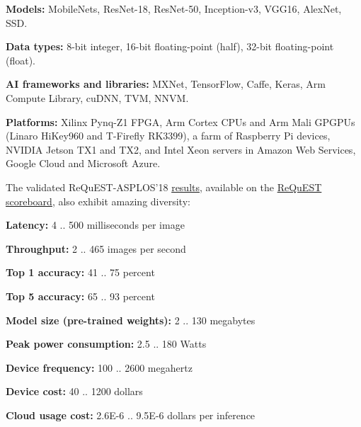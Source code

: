 \documentclass[10pt,onecolumn]{article}
\newenvironment{packed_itemize}{
\begin{itemize}
  \setlength{\itemsep}{1pt}
  \setlength{\parskip}{0pt}
  \setlength{\parsep}{0pt}
}{\end{itemize}}
\begin{document}
\begin{packed_itemize}

 \item \textbf{Models:} MobileNets, ResNet-18, ResNet-50, Inception-v3, VGG16, AlexNet, SSD.
 \item \textbf{Data types:} 8-bit integer, 16-bit floating-point (half), 32-bit floating-point (float).
 \item \textbf{AI frameworks and libraries:} MXNet, TensorFlow, Caffe, Keras, Arm Compute Library, cuDNN, TVM, NNVM.
 \item \textbf{Platforms:} Xilinx Pynq-Z1 FPGA, Arm Cortex CPUs and Arm Mali GPGPUs (Linaro HiKey960 and T-Firefly RK3399), a farm of Raspberry Pi devices, NVIDIA Jetson TX1 and TX2, and Intel Xeon servers in Amazon Web Services, Google Cloud and Microsoft Azure.

\end{packed_itemize}

The validated ReQuEST-ASPLOS'18 \href{http://github.com/ctuning/ck-request-asplos18-results}{results}, 
available on the \href{http://cKnowledge.org/request-results}{ReQuEST scoreboard}, also exhibit amazing diversity:

\begin{packed_itemize}

 \item \textbf{Latency:} 4 .. 500 milliseconds per image
 \item \textbf{Throughput:} 2 .. 465 images per second
 \item \textbf{Top 1 accuracy:} 41 .. 75 percent
 \item \textbf{Top 5 accuracy:} 65 .. 93 percent
 \item \textbf{Model size (pre-trained weights):} 2 .. 130 megabytes
 \item \textbf{Peak power consumption:} 2.5 .. 180 Watts
 \item \textbf{Device frequency:} 100 .. 2600 megahertz
 \item \textbf{Device cost:} 40 .. 1200 dollars
 \item \textbf{Cloud usage cost:} 2.6E-6 .. 9.5E-6 dollars per inference

\end{packed_itemize}
\end{document}
